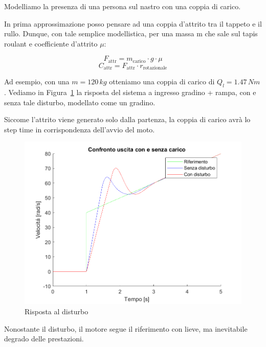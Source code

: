 \documentclass[a4paper,12pt]{article}
\begin{document}
Modelliamo la presenza di una persona sul nastro con una coppia di carico.

In prima approssimazione posso pensare ad una coppia d'attrito tra il tappeto e il rullo. Dunque, con tale semplice modellistica, per una massa m che sale sul tapis roulant e coefficiente d'attrito $\mu$:

\vspace{0.3cm}

\[
    F_{\text{attr}} = m_{\text{carico}} \cdot g \cdot \mu
\]
\[
    C_{\text{attr}} = F_{\text{attr}} \cdot r_{\text{rotazionale}}
\]

\vspace{0.3cm}

Ad esempio, con una $m=120\,kg$ otteniamo una coppia di carico di $Q_l = 1.47\,Nm$. Vediamo in Figura~\ref{fig: disturbo} la risposta del sistema a ingresso gradino + rampa, con e senza tale disturbo, modellato come un gradino.

Siccome l'attrito viene generato solo dalla partenza, la coppia di carico avrà lo step time in corrispondenza dell'avvio del moto.

\vspace{0.5cm}

\begin{figure}[h!]
    \centering
    \includegraphics[scale = 0.65]{Immagini/PlotMatlab/rispostaCoppiaCarico.png}
    \caption{Risposta al disturbo}
    \label{fig: disturbo}
\end{figure}

Nonostante il disturbo, il motore segue il riferimento con lieve, ma inevitabile degrado delle prestazioni.
\end{document}
